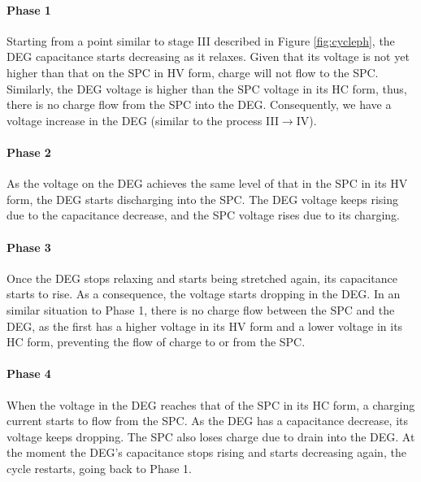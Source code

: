 \paragraph{Phase 1} Starting from a point similar to stage III described in Figure \ref{fig:cycleph}, the DEG capacitance starts decreasing as it relaxes. Given that its voltage is not yet higher than that on the SPC in HV form, charge will not flow to the SPC. Similarly, the DEG voltage is higher than the SPC voltage in its HC form, thus, there is no charge flow from the SPC into the DEG. Consequently, we have a voltage increase in the DEG (similar to the process III$\rightarrow$IV).
\paragraph{Phase 2} As the voltage on the DEG achieves the same level of that in the SPC in its HV form, the DEG starts discharging into the SPC. The DEG voltage keeps rising due to the capacitance decrease, and the SPC voltage rises due to its charging.
\paragraph{Phase 3} Once the DEG stops relaxing and starts being stretched again, its capacitance starts to rise. As a consequence, the voltage starts dropping in the DEG. In an similar situation to Phase 1, there is no charge flow between the SPC and the DEG, as the first has a higher voltage in its HV form and a lower voltage in its HC form, preventing the flow of charge to or from the SPC.
\paragraph{Phase 4} When the voltage in the DEG reaches that of the SPC in its HC form, a charging current starts to flow from the SPC. As the DEG has a capacitance decrease, its voltage keeps dropping. The SPC also loses charge due to drain into the DEG. At the moment the DEG's capacitance stops rising and starts decreasing again, the cycle restarts, going back to Phase 1.



